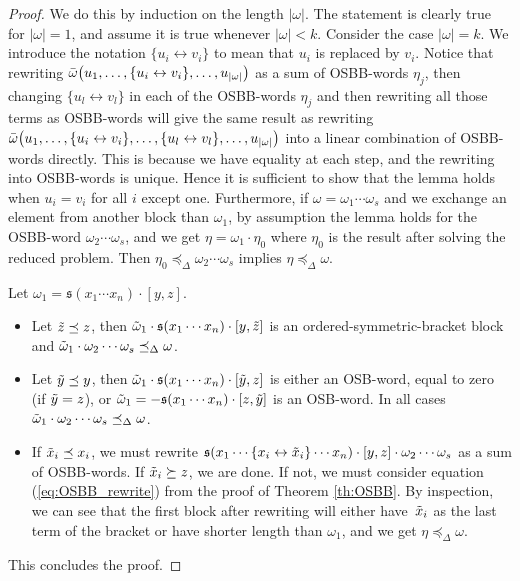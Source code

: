 \documentclass[pdftex]{sigma}
\numberwithin{equation}{section}
\begin{document}
\begin{proof}
 We do this by induction on the length $|\omega|$. The statement is clearly true for $|\omega|=1$, and assume it is true whenever $|\omega|<k$. Consider the case $|\omega|=k$. We introduce the notation $\{u_i \leftrightarrow v_i \}$ to mean that $u_i$ is replaced by $v_i$. Notice that rewriting $\Bar{\omega}\bigl(u_1, \dots , \{ u_i \leftrightarrow v_i \} , \dots ,u_{|\omega|}\bigr)$ as a sum of OSBB-words $\eta_j$, then changing $\{u_l \leftrightarrow v_l \}$ in each of the OSBB-words $\eta_j$ and then rewriting all those terms as OSBB-words will give the same result as rewriting $\Bar{\omega}\bigl(u_1, \dots , \{ u_i \leftrightarrow v_i \} , \dots , \{ u_l \leftrightarrow v_l \} , \dots ,u_{|\omega|}\bigr)$ into a linear combination of OSBB-words directly. This is because we have equality at each step, and the rewriting into OSBB-words is unique. Hence it is sufficient to show that the lemma holds when $u_i = v_i$ for all $i$ except one. Furthermore, if $\omega = \omega_1 \cdots \omega_s$ and we exchange an element from another block than $\omega_1$, by assumption the lemma holds for the OSBB-word $\omega_2 \cdots \omega_s$, and we get $\eta = \omega_1 \cdot \eta_0$ where $\eta_0$ is the result after solving the reduced problem. Then $\eta_0 \preceq_{\Delta} \omega_2 \cdots \omega_s$ implies $\eta \preceq_{\Delta} \omega$.

 Let $\omega_1 = \mathfrak{s}(x_1 \cdots x_n)\cdot[y,z]$.
 \begin{itemize}\itemsep=0pt
 \item Let $\Tilde{z}\preceq z$, then $\Tilde{\omega}_1 \cdot \mathfrak{s}(x_1 \cdots x_n)\cdot[y,\Tilde{z}]$ is an ordered-symmetric-bracket block and $\Tilde{\omega}_1 \cdot \omega_2 \cdots \omega_s \preceq_{\Delta} \omega$.
 \item Let $\Tilde{y} \preceq y$, then $\Tilde{\omega}_1 \cdot \mathfrak{s}(x_1 \cdots x_n)\cdot[\Tilde{y},z]$ is either an OSB-word, equal to zero (if $\Tilde{y}=z$), or $\Tilde{\omega}_1 = - \mathfrak{s}(x_1 \cdots x_n)\cdot[z,\Tilde{y}]$ is an OSB-word. In all cases $\Tilde{\omega}_1 \cdot \omega_2 \cdots \omega_s \preceq_{\Delta} \omega$.
 \item If $\Tilde{x}_i \preceq x_i$, we must rewrite $\mathfrak{s}(x_1 \cdots \{ x_i \leftrightarrow \Tilde{x}_i\} \cdots x_n)\cdot[y,z]\cdot \omega_2 \cdots \omega_s$ as a sum of OSBB-words. If $\Tilde{x}_i \succeq z$, we are done. If not, we must consider equation (\ref{eq:OSBB_rewrite}) from the proof of Theorem \ref{th:OSBB}. By inspection, we can see that the first block after rewriting will either have~$\Tilde{x}_i$ as the last term of the bracket or have shorter length than $\omega_1$, and we get $\eta \preceq_{\Delta} \omega$.
 \end{itemize}
 This concludes the proof.
\end{proof}
\end{document}
